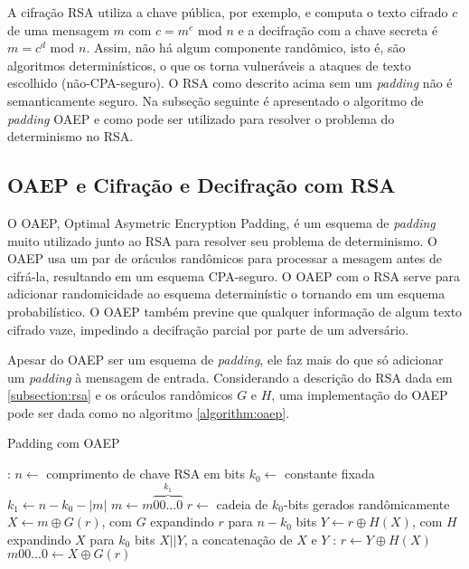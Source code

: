 \documentclass{article}
\begin{document}
A cifração RSA utiliza a chave pública, por exemplo, e computa o texto cifrado $c$ de uma mensagem $m$
com $c = m^e$ mod $n$ e a decifração com a chave secreta é $m = c^d$ mod $n$. Assim, não há algum
componente randômico, isto é, são algoritmos determinísticos, o que os torna vulneráveis a ataques de
texto escolhido (não-CPA-seguro). O RSA como descrito acima sem um \textit{padding} não é semanticamente
seguro. Na subseção seguinte é apresentado o algoritmo de \textit{padding} OAEP e como pode ser utilizado
para resolver o problema do determinismo no RSA.

\subsection{OAEP e Cifração e Decifração com RSA}
\label{subsection:oaep}

O OAEP, Optimal Asymetric Encryption Padding, é um esquema de \textit{padding} muito utilizado junto ao
RSA para resolver seu problema de determinismo. O OAEP usa um par de oráculos randômicos para processar
a mesagem antes de cifrá-la, resultando em um esquema CPA-seguro. O OAEP com o RSA serve para adicionar
randomicidade ao esquema determinístic o tornando em um esquema probabilístico. O OAEP também previne que
qualquer informação de algum texto cifrado vaze, impedindo a decifração parcial por parte de um
adversário.

Apesar do OAEP ser um esquema de \textit{padding}, ele faz mais do que só adicionar um \textit{padding} à
mensagem de entrada. Considerando a descrição do RSA dada em \ref{subsection:rsa} e os oráculos
randômicos $G$ e $H$, uma implementação do OAEP pode ser dada como no algoritmo
\ref{algorithm:oaep}.

\begin{algorithm}
	\caption{Padding com OAEP}
	\label{algorithm:oaep}
	\begin{algorithmic}
		:
		\State $n \leftarrow$ comprimento de chave RSA em bits
		\State $k_0 \leftarrow$ constante fixada
		\State $k_1 \leftarrow n - k_0 - |m|$
		\State $m \leftarrow m\overbrace{00...0}^{k_1}$
		\State $r \leftarrow$ cadeia de $k_0$-bits gerados randômicamente
		\State $X \leftarrow m \oplus G(r)$, com $G$ expandindo $r$ para $n - k_0$ bits
		\State $Y \leftarrow r \oplus H(X)$, com $H$ expandindo $X$ para $k_0$ bits
		\State\Return $X||Y$, a concatenação de $X$ e $Y$
		\EndFunction
		:
		\State $r \leftarrow Y \oplus H(X)$
		\State\Return $m00...0 \leftarrow X \oplus G(r)$
		\EndFunction
	\end{algorithmic}
\end{algorithm}
\end{document}
